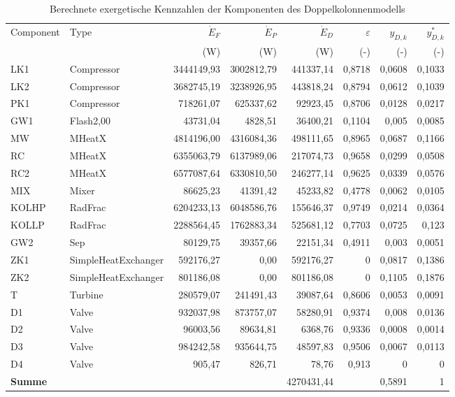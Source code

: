 \begin{longtable}{llrrrrrr}
\caption{Berechnete exergetische Kennzahlen der Komponenten des Doppelkolonnenmodells} \\
\hline
Component & Type & $\dot{E}_F$ & $\dot{E}_P$ & $\dot{E}_D$ & $\varepsilon$ & $y_{D,k}$ & $y^*_{D,k}$  \\
 &  & (W) & (W) & (W) & (-) & (-) & (-)  \\
\hline
LK1 & Compressor & 3444149,93 & 3002812,79 & 441337,14 & 0,8718 & 0,0608 & 0,1033 \\
LK2 & Compressor & 3682745,19 & 3238926,95 & 443818,24 & 0,8794 & 0,0612 & 0,1039 \\
PK1 & Compressor & 718261,07 & 625337,62 & 92923,45 & 0,8706 & 0,0128 & 0,0217 \\
GW1 & Flash2,00 & 43731,04 & 4828,51 & 36400,21 & 0,1104 & 0,005 & 0,0085 \\
MW & MHeatX & 4814196,00 & 4316084,36 & 498111,65 & 0,8965 & 0,0687 & 0,1166 \\
RC & MHeatX & 6355063,79 & 6137989,06 & 217074,73 & 0,9658 & 0,0299 & 0,0508 \\
RC2 & MHeatX & 6577087,64 & 6330810,50 & 246277,14 & 0,9625 & 0,0339 & 0,0576 \\
MIX & Mixer & 86625,23 & 41391,42 & 45233,82 & 0,4778 & 0,0062 & 0,0105 \\
KOLHP & RadFrac & 6204233,13 & 6048586,76 & 155646,37 & 0,9749 & 0,0214 & 0,0364 \\
KOLLP & RadFrac & 2288564,45 & 1762883,34 & 525681,12 & 0,7703 & 0,0725 & 0,123 \\
GW2 & Sep & 80129,75 & 39357,66 & 22151,34 & 0,4911 & 0,003 & 0,0051 \\
ZK1 & SimpleHeatExchanger & 592176,27 & 0,00 & 592176,27 & 0 & 0,0817 & 0,1386 \\
ZK2 & SimpleHeatExchanger & 801186,08 & 0,00 & 801186,08 & 0 & 0,1105 & 0,1876 \\
T & Turbine & 280579,07 & 241491,43 & 39087,64 & 0,8606 & 0,0053 & 0,0091 \\
D1 & Valve & 932037,98 & 873757,07 & 58280,91 & 0,9374 & 0,008 & 0,0136 \\
D2 & Valve & 96003,56 & 89634,81 & 6368,76 & 0,9336 & 0,0008 & 0,0014 \\
D3 & Valve & 984242,58 & 935644,75 & 48597,83 & 0,9506 & 0,0067 & 0,0113 \\
D4 & Valve & 905,47 & 826,71 & 78,76 & 0,913 & 0 & 0 \\
\hline
\textbf{Summe} & &  &  & 4270431,44 &  & 0,5891 & 1 \\
\hline
\end{longtable}
